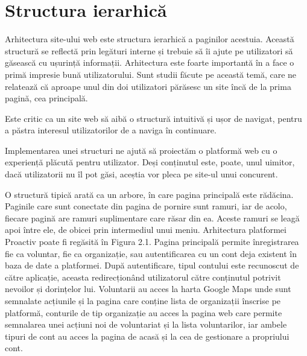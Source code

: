 \documentclass[12pt,a4paper]{report}
\begin{document}
\section{Structura ierarhică}
\par
Arhitectura site-ului web este structura ierarhică a paginilor acestuia. Această structură se reflectă prin legături interne și trebuie să îi ajute pe utilizatori să găsească cu ușurință informații. Arhitectura este foarte importantă în a face o primă impresie bună utilizatorului. Sunt studii făcute pe această temă, care ne relatează că aproape unul din doi utilizatori părăsesc un site încă de la prima pagină, cea principală.
\\\par 
Este critic ca un site web să aibă o structură intuitivă și ușor de navigat, pentru a păstra interesul utilizatorilor de a naviga în continuare.
\\\par 
Implementarea unei structuri ne ajută să proiectăm o platformă web cu o experiență plăcută pentru utilizator. Deși conținutul este, poate, unul uimitor, dacă utilizatorii nu îl pot găsi, aceștia vor pleca pe site-ul unui concurent.
\\\par 
O structură tipică arată ca un arbore, în care pagina principală este rădăcina. Paginile care sunt conectate din pagina de pornire sunt ramuri, iar de acolo, fiecare pagină are ramuri suplimentare care răsar din ea. Aceste ramuri se leagă apoi între ele, de obicei prin intermediul unui meniu.
\newpage
Arhitectura platformei Proactiv poate fi regăsită în Figura 2.1. Pagina principală permite înregistrarea fie ca voluntar, fie ca organizație, sau autentificarea cu un cont deja existent în baza de date a platformei. După autentificare, tipul contului este recunoscut de către aplicație, aceasta redirecționând utilizatorul către conținutul potrivit nevoilor și dorințelor lui. Voluntarii au acces la harta Google Maps unde sunt semnalate acțiunile și la pagina care conține lista de organizații înscrise pe platformă, conturile de tip organizație au acces la pagina web care permite semnalarea unei acțiuni noi de voluntariat și la lista voluntarilor, iar ambele tipuri de cont au acces la pagina de acasă și la cea de gestionare a propriului cont.
\bigskip
\end{document}

